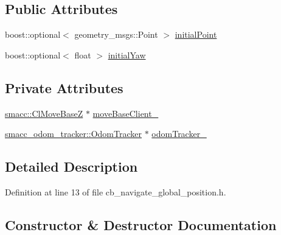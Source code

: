 \subsection*{Public Attributes}
\begin{DoxyCompactItemize}
\item 
boost\+::optional$<$ geometry\+\_\+msgs\+::\+Point $>$ \hyperlink{classsm__dance__bot_1_1CbNavigateGlobalPosition_a9b81342ca5492d3b9724c488c1f39f4f}{initial\+Point}
\item 
boost\+::optional$<$ float $>$ \hyperlink{classsm__dance__bot_1_1CbNavigateGlobalPosition_ad7ac13ee1b0f1a5dfdd47639930ab34c}{initial\+Yaw}
\end{DoxyCompactItemize}
\subsection*{Private Attributes}
\begin{DoxyCompactItemize}
\item 
\hyperlink{classsmacc_1_1ClMoveBaseZ}{smacc\+::\+Cl\+Move\+BaseZ} $\ast$ \hyperlink{classsm__dance__bot_1_1CbNavigateGlobalPosition_a1d94ab79bdffa994748287c09bd8c18e}{move\+Base\+Client\+\_\+}
\item 
\hyperlink{classsmacc__odom__tracker_1_1OdomTracker}{smacc\+\_\+odom\+\_\+tracker\+::\+Odom\+Tracker} $\ast$ \hyperlink{classsm__dance__bot_1_1CbNavigateGlobalPosition_a1d9fbebe8579cdef9485698e99ca8a41}{odom\+Tracker\+\_\+}
\end{DoxyCompactItemize}


\subsection{Detailed Description}


Definition at line 13 of file cb\+\_\+navigate\+\_\+global\+\_\+position.\+h.



\subsection{Constructor \& Destructor Documentation}
